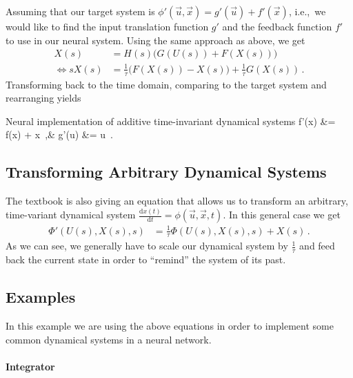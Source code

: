 \documentclass[10pt,letterpaper,oneside]{article}
\begin{document}
Assuming that our target system is $\phi '(\vec u, \vec x) = g'(\vec u) + f'(\vec x)$, i.e.,~we would like to find the input translation function $g'$ and the feedback function $f'$ to use in our neural system. Using the same approach as above, we get
\begin{align*}
	X(s) &= H(s) \big(G(U(s)) + F(X(s))\big) \\
	\Leftrightarrow s X(s) &= \frac{1}{\tau} \big( F(X(s)) - X(s) \big) + \frac{1}{\tau} G(X(s))  \,.
\end{align*}
Transforming back to the time domain, comparing to the target system and rearranging yields
\begin{ImportantEqn}{Neural implementation of additive time-invariant dynamical systems}
	f'(\vec x) &= \tau f(\vec x) + \vec x \,,& g'(\vec u) &= \tau \vec u \,.
	\label{eqn:nef_additive_dyn}
\end{ImportantEqn}


\subsection{Transforming Arbitrary Dynamical Systems}

The textbook is also giving an equation that allows us to transform an arbitrary, time-variant dynamical system $\frac{\mathrm{d}x(t)}{\mathrm{d}t} = \phi(\vec u, \vec x, t)$. In this general case we get
\begin{align*}
	\Phi'(U(s), X(s), s) &= \frac{1}{\tau} \Phi(U(s), X(s), s) + X(s) \,.
\end{align*}
As we can see, we generally have to scale our dynamical system by $\frac{1}{\tau}$ and feed back the current state in order to \enquote{remind} the system of its past.

\subsection{Examples}

In this example we are using the above equations in order to implement some common dynamical systems in a neural network.

\paragraph{Integrator}
\end{document}
